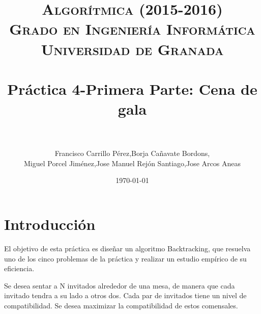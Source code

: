 
 \usepackage{algpseudocode}

\title{	
\normalfont \normalsize 
\textsc{{\bf Algorítmica (2015-2016)} \\ Grado en Ingeniería Informática \\ Universidad de Granada} \\ [25pt] %
\horrule{0.5pt} \\[0.4cm] %
\huge Práctica 4-Primera Parte: Cena de gala \\ %
\horrule{2pt} \\[0.5cm] %
}

\author{Francisco Carrillo Pérez,Borja Cañavate Bordons, \\Miguel Porcel Jiménez,Jose Manuel Rejón Santiago,Jose Arcos Aneas} %

\date{\normalsize\today} %




\maketitle %

\newpage %

\tableofcontents %

\listoffigures

\listoftables

\newpage

\section{Introducción }

El objetivo de esta práctica es diseñar un algoritmo Backtracking, que resuelva uno de los cinco problemas de la práctica y realizar un estudio empírico de su eficiencia.
	
	Se desea sentar a N invitados alrededor de una mesa, de manera que cada invitado tendra a su lado a otros dos. Cada par de invitados tiene un nivel de compatibilidad. Se desea maximizar la compatibilidad de estos comensales.

